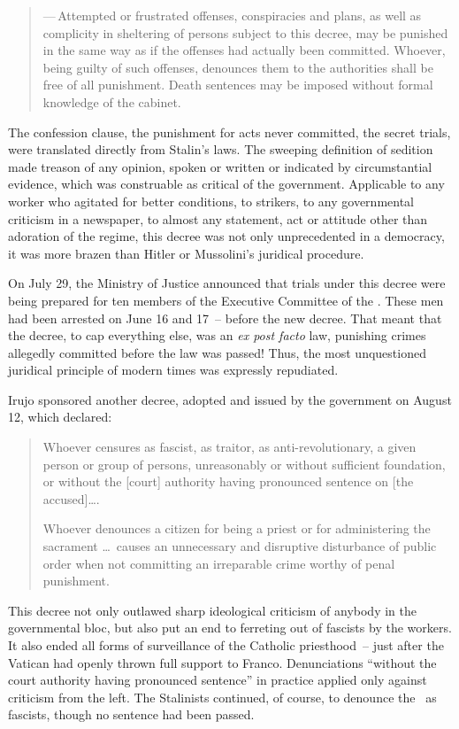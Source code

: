 \begin{quotation}
  \noindent
  —\,Attempted or frustrated offenses, conspiracies and plans, as well as complicity in sheltering of persons subject to this decree, may be punished in the same way as if the offenses had actually been committed. Whoever, being guilty of such offenses, denounces them to the authorities shall be free of all punishment. Death sentences may be imposed without formal knowledge of the cabinet.
\end{quotation}

The confession clause, the punishment for acts never committed, the secret trials, were translated directly from Stalin’s laws. The sweeping definition of sedition made treason of any opinion, spoken or written or indicated by circumstantial evidence, which was construable as critical of the government. Applicable to any worker who agitated for better conditions, to strikers, to any governmental criticism in a newspaper, to almost any statement, act or attitude other than adoration of the regime, this decree was not only unprecedented in a democracy, it was more brazen than Hitler or Mussolini’s juridical procedure.

On July 29, the Ministry of Justice announced that trials under this decree were being prepared for ten members of the Executive Committee of the \POUM\kn. These men had been arrested on June 16 and 17~-- before the new decree. That meant that the decree, to cap everything else, was an \emph{ex post facto} law, punishing crimes allegedly committed before the law was passed! Thus, the most unquestioned juridical principle of modern times was expressly repudiated.

\medskip

Irujo sponsored another decree, adopted and issued by the government on August 12, which declared:

\begin{quotation}
  Whoever censures as fascist, as traitor, as anti-rev\-o\-lu\-tion\-ary, a given person or group of persons, unreasonably or without sufficient foundation, or without the [court] authority having pronounced sentence on [the accused]\dots.
  
  Whoever denounces a citizen for being a priest or for administering the sacrament \dots\ causes an unnecessary and disruptive disturbance of public order when not committing an irreparable crime worthy of penal punishment.
\end{quotation}

This decree not only outlawed sharp ideological criticism of anybody in the governmental bloc, but also put an end to ferreting out of fascists by the workers. It also ended all forms of surveillance of the Catholic priesthood~-- just after the Vatican had openly thrown full support to Franco. Denunciations ``without the court authority having pronounced sentence'' in practice applied only against criticism from the left. The Stalinists continued, of course, to denounce the \POUM\ as fascists, though no sentence had been passed.

